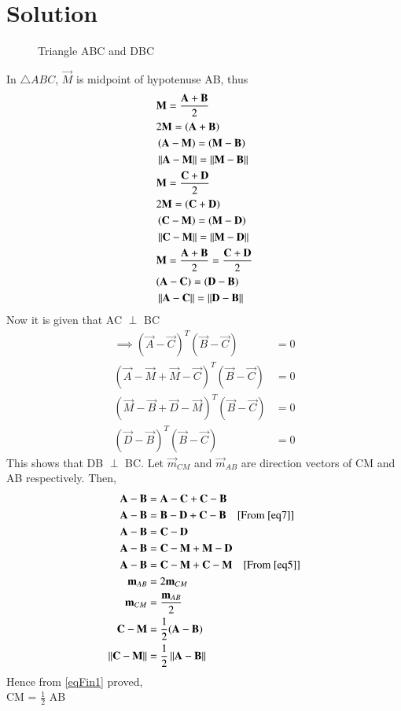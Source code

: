 \documentclass[journal,12pt,twocolumn]{IEEEtran}
\begin{document}
\section{Solution}
\renewcommand{\thefigure}{1}
\begin{figure}[hb]
\centering
\resizebox{.9\linewidth}{!}{}
\caption{Triangle ABC and DBC}
\label{myfig}
\end{figure}
In $\triangle{ABC}$, $\vec{M}$ is midpoint of hypotenuse AB, thus 
\begin{align}
&\mathbf{M} = \frac{\mathbf{A}+\mathbf{B}}{2}\label{eq1} \\
&2\mathbf{M} = \left(\mathbf{A+B}\right)\\
&\left(\mathbf{A-M}\right) = \left(\mathbf{M-B}\right)\\
&\left\lVert\mathbf{A}-\mathbf{M}\right\rVert=\left\lVert\mathbf{M}-\mathbf{B}\right\rVert\label{eq4} \\
&\mathbf{M} = \frac{\mathbf{C}+\mathbf{D}}{2}\label{eq2} \\
&2\mathbf{M} = \left(\mathbf{C+D}\right)\\
&\left(\mathbf{C-M}\right) = \left(\mathbf{M-D}\right)\\
&\left\lVert\mathbf{C}-\mathbf{M}\right\rVert=\left\lVert\mathbf{M}-\mathbf{D}\right\rVert\label{eq5} \\
&\mathbf{M} = \frac{\mathbf{A}+\mathbf{B}}{2} = \frac{\mathbf{C}+\mathbf{D}}{2}\label{eq3} \\
&(\mathbf{A - C}) = (\mathbf{D - B}) \\
&\left\lVert\mathbf{A - C}\right\rVert = \left\lVert\mathbf{D - B}\right\rVert\label{eq7}
\end{align} 
Now it is given that AC $\perp$ BC 
\begin{align}
\implies(\vec A -\vec C)^T(\vec{B}-\vec{C}) &= 0 \\
(\vec A -\vec M +\vec M -\vec C)^T(\vec{B}-\vec{C}) &= 0 \\
(\vec M -\vec B +\vec D -\vec M)^T(\vec{B}-\vec{C}) &= 0 \\
(\vec D -\vec B)^T(\vec{B}-\vec{C}) &= 0
\end{align}
This shows that DB $\perp$ BC.
Let $\vec{m}_{CM}$ and $\vec{m}_{AB}$ are direction vectors of CM and AB respectively. Then,
\begin{align}
\mathbf{A - B} &= \mathbf{A - C}+\mathbf{C - B} \\
\mathbf{A - B} &= \mathbf{B - D}+\mathbf{C - B} \quad\text{[From \eqref{eq7}]}\\
\mathbf{A - B} &= \mathbf{C - D} \\
\mathbf{A - B} &= \mathbf{C - M}+\mathbf{M - D} \\
\mathbf{A - B} &= \mathbf{C - M}+\mathbf{C - M} \quad\text{[From \eqref{eq5}]} \\
\mathbf{m}_{AB} &= 2{\mathbf{m}_{CM}} \\
\mathbf{m}_{CM} &= \frac{\mathbf{m}_{AB}}{2} \\
\mathbf{C - M} &= \frac{1}{2}(\mathbf{A - B}) \\
\left\lVert\mathbf{C - M}\right\rVert &= \frac{1}{2}\left\lVert\mathbf{A - B}\right\rVert\label{eqFin1}
\end{align}
Hence from \eqref{eqFin1} proved,\\CM = $\frac{1}{2}$ AB
\end{document}
